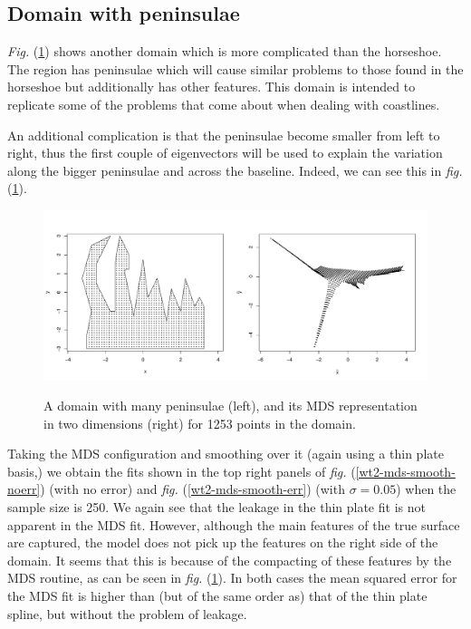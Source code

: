 \documentclass[a4paper,10pt]{article}
\newcommand{\fig}[1]{\emph{fig.} (\ref{#1})}
\newcommand{\Fig}[1]{\emph{Fig.} (\ref{#1})}
\begin{document}







\subsection{Domain with peninsulae}

\Fig{wt2dia} shows another domain which is more complicated than the horseshoe. The region has peninsulae which will cause similar problems to those found in the horseshoe but additionally has other features. This domain is intended to replicate some of the problems that come about when dealing with coastlines.

An additional complication is that the peninsulae become smaller from left to right, thus the first couple of eigenvectors will be used to explain the variation along the bigger peninsulae and across the baseline. Indeed, we can see this in \fig{wt2dia}.

\begin{figure}
\centering
\includegraphics[width=6in]{figs/wt2-mds.pdf}\\
\caption{A domain with many peninsulae (left), and its MDS representation in two dimensions (right) for 1253 points in the domain.}
\label{wt2dia}
\end{figure}

Taking the MDS configuration and smoothing over it (again using a thin plate basis,) we obtain the fits shown in the top right panels of \fig{wt2-mds-smooth-noerr} (with no error) and \fig{wt2-mds-smooth-err} (with $\sigma=0.05$) when the sample size is 250. We again see that the leakage in the thin plate fit is not apparent in the MDS fit. However, although the main features of the true surface are captured, the model does not pick up the features on the right side of the domain. It seems that this is because of the compacting of these features by the MDS routine, as can be seen in \fig{wt2dia}. In both cases the mean squared error for the MDS fit is higher than (but of the same order as) that of the thin plate spline, but without the problem of leakage.
\end{document}
